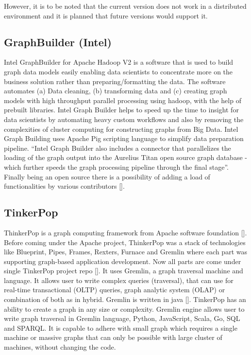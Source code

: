     However, it is to be noted that the current version does not work
    in a distributed environment and it is planned that future
    versions would support it.
    
\subsection{GraphBuilder (Intel)}

Intel GraphBuilder for Apache Hadoop V2 is a software that is used to
build graph data models easily enabling data scientists to concentrate
more on the business solution rather than preparing/formatting the
data. The software automates (a) Data cleaning, (b) transforming data and
(c) creating graph models with high throughput parallel processing using
hadoop, with the help of prebuilt libraries. Intel Graph Builder helps
to speed up the time to insight for data scientists by automating
heavy custom workflows and also by removing the complexities of
cluster computing for constructing graphs from Big Data. Intel Graph
Building uses Apache Pig scripting language to simplify data
preparation pipeline.  ``Intel Graph Builder also includes a connector
that parallelizes the loading of the graph output into the Aurelius
Titan open source graph database - which further speeds the graph
processing pipeline through the final stage''.  Finally being an open
source there is a possibility of adding a load of functionalities by
various contributors [\cite{graphbuilder}].

    
\subsection{TinkerPop}
    
ThinkerPop is a graph computing framework from Apache software
foundation [\cite{www-ApacheTinkerPop}]. Before coming under the Apache
project, ThinkerPop was a stack of technologies like Blueprint, Pipes,
Frames, Rexters, Furnace and Gremlin where each part was supporting
graph-based application development. Now all parts are come under
single TinkerPop project repo [\cite{www-news}]. It uses Gremlin, a
graph traversal machine and language. It allows user to write complex
queries (traversal), that can use for real-time transactional (OLTP)
queries, graph analytic system (OLAP) or combination of both as in
hybrid. Gremlin is written in
java [\cite{www-ApacheTinkerPopHome}]. TinkerPop has an ability to
create a graph in any size or complexity. Gremlin engine allows user
to write graph traversal in Gremlin language, Python, JavaScript,
Scala, Go, SQL and SPARQL. It is capable to adhere with small graph
which requires a single machine or massive graphs that can only be
possible with large cluster of machines, without changing the code.


